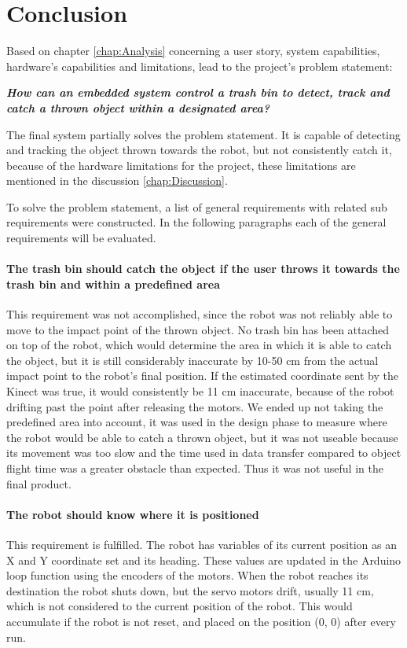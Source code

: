 \chapter{Conclusion}
\label{chap:Conclusion}
Based on chapter \ref{chap:Analysis} concerning a user story, system capabilities, hardware's capabilities and limitations, lead to the project’s problem statement: 


\textbf{\textit{How can an embedded system control a trash bin to detect, track and catch a thrown object within a designated area?}}


The final system partially solves the problem statement. It is capable of detecting and tracking the object thrown towards the robot, but not consistently catch it, because of the hardware limitations for the project, these limitations are mentioned in the discussion \ref{chap:Discussion}. 


To solve the problem statement, a list of general requirements with related sub requirements were constructed. In the following paragraphs each of the general requirements will be evaluated. 


\subsubsection{The trash bin should catch the object if the user throws it towards the trash bin and within a predefined area}
\label{sub:1}
This requirement was not accomplished, since the robot was not reliably able to move to the impact point of the thrown object. No trash bin has been attached on top of the robot, which would determine the area in which it is able to catch the object, but it is still considerably inaccurate by 10-50 cm from the actual impact point to the robot’s final position. If the estimated coordinate sent by the Kinect was true, it would consistently be 11 cm inaccurate, because of the robot drifting past the point after releasing the motors. \newline
We ended up not taking the predefined area into account, it was used in the design phase to measure where the robot would be able to catch a thrown object, but it was not useable because its movement was too slow and the time used in data transfer compared to object flight time was a greater obstacle than expected. Thus it was not useful in the final product.




\subsubsection{The robot should know where it is positioned}
This requirement is fulfilled. The robot has variables of its current position as an X and Y coordinate set and its heading. These values are updated in the Arduino loop function using the encoders of the motors. When the robot reaches its destination the robot shuts down, but the servo motors drift, usually 11 cm, which is not considered to the current position of the robot. This would accumulate if the robot is not reset, and placed on the position (0, 0) after every run.


